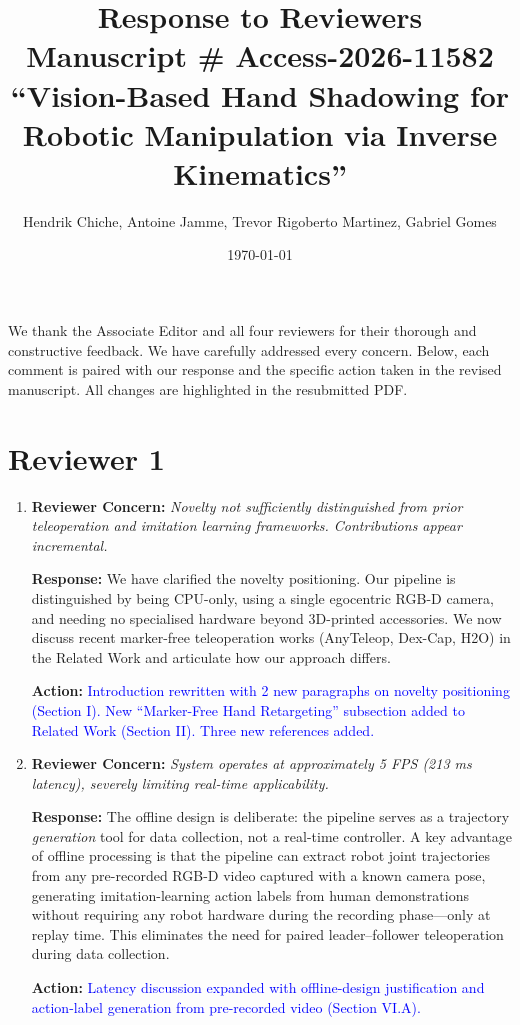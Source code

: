 \documentclass[11pt]{article}
\title{Response to Reviewers\\
\large Manuscript \# Access-2026-11582\\
``Vision-Based Hand Shadowing for Robotic Manipulation via Inverse Kinematics''}
\author{Hendrik Chiche, Antoine Jamme, Trevor Rigoberto Martinez, Gabriel Gomes}
\date{\today}
\newcommand{\concern}[1]{\textbf{Reviewer Concern:} \textit{#1}}
\newcommand{\response}[1]{\textbf{Response:} #1}
\newcommand{\action}[1]{\textbf{Action:} \textcolor{blue}{#1}}
\begin{document}
\maketitle

We thank the Associate Editor and all four reviewers for their thorough and constructive feedback. We have carefully addressed every concern. Below, each comment is paired with our response and the specific action taken in the revised manuscript. All changes are highlighted in the resubmitted PDF.

\section*{Reviewer 1}

\begin{enumerate}[label=\textbf{R1.\arabic*}]

\item \concern{Novelty not sufficiently distinguished from prior teleoperation and imitation learning frameworks. Contributions appear incremental.}

\response{We have clarified the novelty positioning. Our pipeline is distinguished by being CPU-only, using a single egocentric RGB-D camera, and needing no specialised hardware beyond 3D-printed accessories. We now discuss recent marker-free teleoperation works (AnyTeleop, Dex-Cap, H2O) in the Related Work and articulate how our approach differs.}

\action{Introduction rewritten with 2 new paragraphs on novelty positioning (Section I). New ``Marker-Free Hand Retargeting'' subsection added to Related Work (Section II). Three new references added.}

\item \concern{System operates at approximately 5 FPS (213 ms latency), severely limiting real-time applicability.}

\response{The offline design is deliberate: the pipeline serves as a trajectory \emph{generation} tool for data collection, not a real-time controller. A key advantage of offline processing is that the pipeline can extract robot joint trajectories from any pre-recorded RGB-D video captured with a known camera pose, generating imitation-learning action labels from human demonstrations without requiring any robot hardware during the recording phase---only at replay time. This eliminates the need for paired leader--follower teleoperation during data collection.}

\action{Latency discussion expanded with offline-design justification and action-label generation from pre-recorded video (Section VI.A).}


\end{enumerate}
\end{document}
